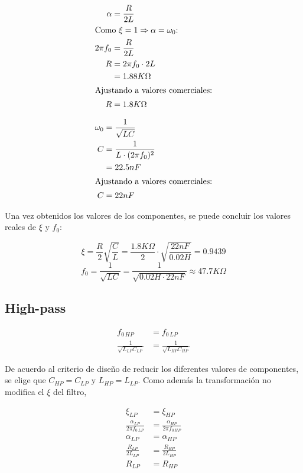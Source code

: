 \begin{align}	%
	\alpha &= \frac{R}{2L}	\\
	\intertext{Como $\xi = 1 \Rightarrow \alpha = \omega _0$:}
	2\pi f_0 &= \frac{R}{2L}\\ 
	R &= 2\pi f_0 \cdot 2L 	\\
	&= 1.88K\Omega			\\
	\intertext{Ajustando a valores comerciales:}
	R &= 1.8K\Omega
\end{align}

\begin{align}	%
	\omega_0 &= \frac{1}{\sqrt{LC}}		\\
	C &= \frac{1}{L\cdot (2\pi f_0)^2}	\\
	&= 22.5nF 							\\
	\intertext{Ajustando a valores comerciales:}
	C&=22nF
\end{align}

Una vez obtenidos los valores de los componentes, se puede concluir los valores reales de $\xi$ y $f_0$:

\[\xi = \frac{R}{2} \sqrt{\frac{C}{L}} = \frac{1.8K\Omega}{2} \cdot \sqrt{\frac{22nF}{0.02H}}=0.9439 \]
\[f_0 = \frac{1}{\sqrt{LC}} = \frac{1}{\sqrt{0.02H\cdot 22nF} }\approx47.7K\Omega\]

\subsection{High-pass}	\label{ssec:ej2_HP_componentes}

\begin{align}	%
f_{0\, HP} &= f_{0\, LP} \\
\frac{1}{\sqrt{L_{LP}C_{LP}}} &= \frac{1}{\sqrt{L_{HP}C_{HP}}}
\end{align} 

De acuerdo al criterio de dise\~no de reducir los diferentes valores de componentes, se elige que $C_{HP} = C_{LP}$ y $L_{HP} = L_{LP}$.
Como adem\'as la transformaci\'on no modifica el $\xi$ del filtro, 

\begin{align} %
\xi_{LP} &= \xi_{HP}	\\
\frac{\alpha_{LP}}{2\pi f_{0\, LP}}&=\frac{\alpha_{HP}}{2\pi f_{0\, HP}} \\
\alpha_{LP} &= \alpha_{HP} \\
\frac{R_{LP}}{2L_{LP}} &= \frac{R_{HP}}{2L_{HP}} \\
R_{LP} &= R_{HP}
\end{align}

